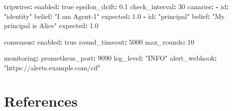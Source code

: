 \documentclass[
]{article}
\newenvironment{Shaded}{}{}
\newcommand{\AttributeTok}[1]{\textcolor[rgb]{0.49,0.56,0.16}{#1}}
\newcommand{\CharTok}[1]{\textcolor[rgb]{0.25,0.44,0.63}{#1}}
\newcommand{\DecValTok}[1]{\textcolor[rgb]{0.25,0.63,0.44}{#1}}
\newcommand{\FloatTok}[1]{\textcolor[rgb]{0.25,0.63,0.44}{#1}}
\newcommand{\FunctionTok}[1]{\textcolor[rgb]{0.02,0.16,0.49}{#1}}
\newcommand{\KeywordTok}[1]{\textcolor[rgb]{0.00,0.44,0.13}{\textbf{#1}}}
\newcommand{\StringTok}[1]{\textcolor[rgb]{0.25,0.44,0.63}{#1}}
\begin{document}
\begin{Shaded}
\begin{Highlighting}[]
\AttributeTok{  }\FunctionTok{tripwires}\KeywordTok{:}
\AttributeTok{    }\FunctionTok{enabled}\KeywordTok{:}\AttributeTok{ }\CharTok{true}
\AttributeTok{    }\FunctionTok{epsilon\_drift}\KeywordTok{:}\AttributeTok{ }\FloatTok{0.1}
\AttributeTok{    }\FunctionTok{check\_interval}\KeywordTok{:}\AttributeTok{ }\DecValTok{30}
\AttributeTok{    }\FunctionTok{canaries}\KeywordTok{:}
\AttributeTok{      }\KeywordTok{{-}}\AttributeTok{ }\FunctionTok{id}\KeywordTok{:}\AttributeTok{ }\StringTok{"identity"}
\AttributeTok{        }\FunctionTok{belief}\KeywordTok{:}\AttributeTok{ }\StringTok{"I am Agent{-}1"}
\AttributeTok{        }\FunctionTok{expected}\KeywordTok{:}\AttributeTok{ }\FloatTok{1.0}
\AttributeTok{      }\KeywordTok{{-}}\AttributeTok{ }\FunctionTok{id}\KeywordTok{:}\AttributeTok{ }\StringTok{"principal"}
\AttributeTok{        }\FunctionTok{belief}\KeywordTok{:}\AttributeTok{ }\StringTok{"My principal is Alice"}
\AttributeTok{        }\FunctionTok{expected}\KeywordTok{:}\AttributeTok{ }\FloatTok{1.0}

\AttributeTok{  }\FunctionTok{consensus}\KeywordTok{:}
\AttributeTok{    }\FunctionTok{enabled}\KeywordTok{:}\AttributeTok{ }\CharTok{true}
\AttributeTok{    }\FunctionTok{round\_timeout}\KeywordTok{:}\AttributeTok{ }\DecValTok{5000}
\AttributeTok{    }\FunctionTok{max\_rounds}\KeywordTok{:}\AttributeTok{ }\DecValTok{10}

\AttributeTok{  }\FunctionTok{monitoring}\KeywordTok{:}
\AttributeTok{    }\FunctionTok{prometheus\_port}\KeywordTok{:}\AttributeTok{ }\DecValTok{9090}
\AttributeTok{    }\FunctionTok{log\_level}\KeywordTok{:}\AttributeTok{ }\StringTok{"INFO"}
\AttributeTok{    }\FunctionTok{alert\_webhook}\KeywordTok{:}\AttributeTok{ }\StringTok{"https://alerts.example.com/cif"}
\end{Highlighting}
\end{Shaded}

\newpage

\section{References}\label{sec:references}

\printbibliography





\end{document}
